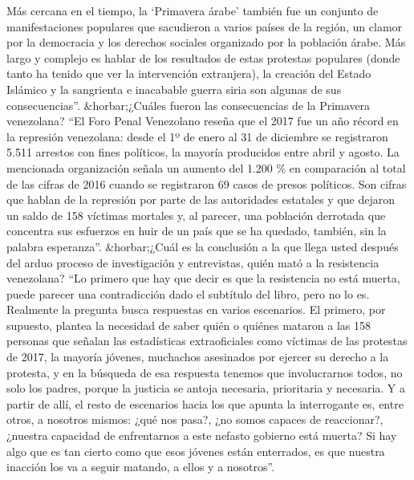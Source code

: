 \documentclass{article}%
\begin{document}
\newline%
%
Más cercana en el tiempo, la ‘Primavera árabe’ también fue un conjunto de manifestaciones populares que sacudieron a varios países de la región, un clamor por la democracia y los derechos sociales organizado por la población árabe. Más largo y complejo es hablar de los resultados de estas protestas populares (donde tanto ha tenido que ver la intervención extranjera), la creación del Estado Islámico y la sangrienta e inacabable guerra siria son algunas de sus consecuencias”.%
\newline%
%
\&horbar;¿Cuáles fueron las consecuencias de la Primavera venezolana?%
\newline%
%
“El Foro Penal Venezolano reseña que el 2017 fue un año récord en la represión venezolana: desde el 1º de enero al 31 de diciembre se registraron 5.511 arrestos con fines políticos, la mayoría producidos entre abril y agosto. La mencionada organización señala un aumento del 1.200 \% en comparación al total de las cifras de 2016 cuando se registraron 69 casos de presos políticos.%
\newline%
%
Son cifras que hablan de la represión por parte de las autoridades estatales y que dejaron un saldo de 158 víctimas mortales y, al parecer, una población derrotada que concentra sus esfuerzos en huir de un país que se ha quedado, también, sin la palabra esperanza”.%
\newline%
%
\&horbar;¿Cuál es la conclusión a la que llega usted después del arduo proceso de investigación y entrevistas, quién mató a la resistencia venezolana?%
\newline%
%
“Lo primero que hay que decir es que la resistencia no está muerta, puede parecer una contradicción dado el subtítulo del libro, pero no lo es. Realmente la pregunta busca respuestas en varios escenarios. El primero, por supuesto, plantea la necesidad de saber quién o quiénes mataron a las 158 personas que señalan las estadísticas extraoficiales como víctimas de las protestas de 2017, la mayoría jóvenes, muchachos asesinados por ejercer su derecho a la protesta, y en la búsqueda de esa respuesta tenemos que involucrarnos todos, no solo los padres, porque la justicia se antoja necesaria, prioritaria y necesaria. Y a partir de allí, el resto de escenarios hacia los que apunta la interrogante es, entre otros, a nosotros mismos: ¿qué nos pasa?, ¿no somos capaces de reaccionar?, ¿nuestra capacidad de enfrentarnos a este nefasto gobierno está muerta? Si hay algo que es tan cierto como que esos jóvenes están enterrados, es que nuestra inacción los va a seguir matando, a ellos y a nosotros”.%
\end{document}
